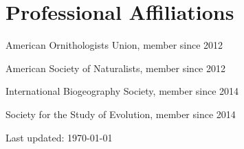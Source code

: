 \documentclass[letterpaper]{article}
\def\footerlink{}
\renewenvironment{itemize}{
  \begin{list}{}{
    \setlength{\leftmargin}{1.5em}
  }
}{
  \end{list}
}
\begin{document}
\section*{Professional Affiliations}
\begin{itemize}
\item American Ornithologists Union, member since 2012
\item American Society of Naturalists, member since 2012
\item International Biogeography Society, member since 2014
\item Society for the Study of Evolution, member since 2014 
\end{itemize}


\bigskip

\begin{center}
  \begin{footnotesize}
    Last updated: \today \\
    \href{\footerlink}{\texttt{\footerlink}}
  \end{footnotesize}
\end{center}
\end{document}

